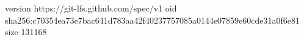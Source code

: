 version https://git-lfs.github.com/spec/v1
oid sha256:c70354ea73e7bac641d783aa42f40237757085a0144e07859e60cde31a0f6e81
size 131168
